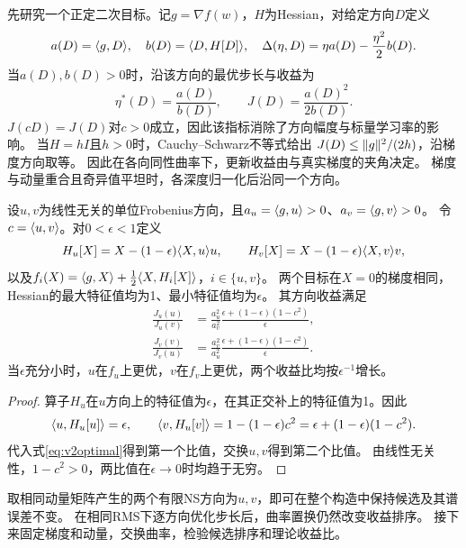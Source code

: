 先研究一个正定二次目标。记$g=\nabla f(w)$，$H$为Hessian，对给定方向$D$定义
\begin{equation}\label{eq:v2gain}
 a(D)=\langle g,D\rangle,\quad b(D)=\langle D,H[D]\rangle,\quad
 \Delta(\eta,D)=\eta a(D)-\frac{\eta^2}{2}b(D).
\end{equation}
当$a(D),b(D)>0$时，沿该方向的最优步长与收益为
\begin{equation}\label{eq:v2optimal}
 \eta^*(D)=\frac{a(D)}{b(D)},\qquad
 J(D)=\frac{a(D)^2}{2b(D)}.
\end{equation}
$J(cD)=J(D)$对$c>0$成立，因此该指标消除了方向幅度与标量学习率的影响。
当$H=hI$且$h>0$时，Cauchy--Schwarz不等式给出
$J(D)\le\lVert g\rVert^2/(2h)$，沿梯度方向取等。
因此在各向同性曲率下，更新收益由与真实梯度的夹角决定。
梯度与动量重合且奇异值平坦时，各深度归一化后沿同一个方向。

\begin{theorem}[相同动量下的曲率反转]\label{thm:v2reversal}
设$u,v$为线性无关的单位Frobenius方向，且$a_u=\langle g,u\rangle>0$、$a_v=\langle g,v\rangle>0$。
令$c=\langle u,v\rangle$。对$0<\epsilon<1$定义
\begin{equation}
 H_u[X]=X-(1-\epsilon)\langle X,u\rangle u,\qquad
 H_v[X]=X-(1-\epsilon)\langle X,v\rangle v,
\end{equation}
以及$f_i(X)=\langle g,X\rangle+\tfrac12\langle X,H_i[X]\rangle$，$i\in\{u,v\}$。
两个目标在$X=0$的梯度相同，Hessian的最大特征值均为1、最小特征值均为$\epsilon$。
其方向收益满足
\begin{align}
 \frac{J_u(u)}{J_u(v)}&=\frac{a_u^2}{a_v^2}
       \frac{\epsilon+(1-\epsilon)(1-c^2)}{\epsilon},\\
 \frac{J_v(v)}{J_v(u)}&=\frac{a_v^2}{a_u^2}
       \frac{\epsilon+(1-\epsilon)(1-c^2)}{\epsilon}.
\end{align}
当$\epsilon$充分小时，$u$在$f_u$上更优，$v$在$f_v$上更优，两个收益比均按$\epsilon^{-1}$增长。
\end{theorem}
\begin{proof}
算子$H_u$在$u$方向上的特征值为$\epsilon$，在其正交补上的特征值为1。因此
\[
 \langle u,H_u[u]\rangle=\epsilon,\qquad
 \langle v,H_u[v]\rangle=1-(1-\epsilon)c^2
                =\epsilon+(1-\epsilon)(1-c^2).
\]
代入式\eqref{eq:v2optimal}得到第一个比值，交换$u,v$得到第二个比值。
由线性无关性，$1-c^2>0$，两比值在$\epsilon\to0$时均趋于无穷。
\end{proof}

取相同动量矩阵产生的两个有限NS方向为$u,v$，即可在整个构造中保持候选及其谱误差不变。
在相同RMS下逐方向优化步长后，曲率置换仍然改变收益排序。
接下来固定梯度和动量，交换曲率，检验候选排序和理论收益比。

